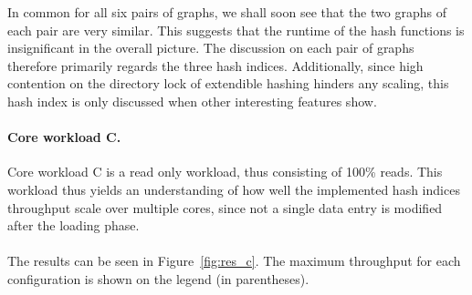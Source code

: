 \documentclass[11pt]{report} %
\begin{document}
In common for all six pairs of graphs, we shall soon see that the two graphs of each pair are very similar. This suggests that the runtime of the hash functions is insignificant in the overall picture. The discussion on each pair of graphs therefore primarily regards the three hash indices. Additionally, since high contention on the directory lock of extendible hashing hinders any scaling, this hash index is only discussed when other interesting features show.

\paragraph{Core workload C.} Core workload C is a read only workload, thus consisting of 100\% reads. This workload thus yields an understanding of how well the implemented hash indices throughput scale over multiple cores, since not a single data entry is modified after the loading phase. \\
\\
The results can be seen in Figure~\ref{fig:res_c}. The maximum throughput for each configuration is shown on the legend (in parentheses).
\end{document}
